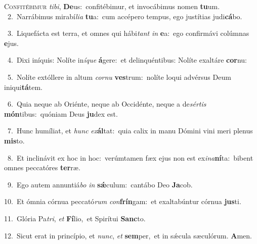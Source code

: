 \lettrine{\initial\textcolor{\initialcolor}{C}}{onfitébimur} \textit{ti}\-\textit{bi}, \textbf{De}\-us:~\star confitébimur, et invocábimus nomen \textbf{tu}\-um.\\
{\numbfont\textcolor{\numbcolor}{~2.}}~Narrábimus mirabí\-\textit{li}\-\textit{a} \textbf{tu}\-a:~\star cum accépero tempus, ego justítias judi\-\textbf{cá}\-bo.\par
{\numbfont\textcolor{\numbcolor}{~3.}}~Liquefácta est terra, et omnes qui hábi\textit{tant} \textit{in} \textbf{e}\-a:~\star ego confirmávi colúmnas \textbf{e}\-jus.\par
{\numbfont\textcolor{\numbcolor}{~4.}}~Dixi iníquis: Nolíte in\-\textit{í}\-\textit{que} \textbf{á}\-gere:~\star et delinquéntibus: Nolíte exaltáre \textbf{cor}\-nu:\par
{\numbfont\textcolor{\numbcolor}{~5.}}~Nolíte extóllere in altum \textit{cor}\-\textit{nu} \textbf{ves}\-trum:~\star nolíte loqui advérsus Deum iniqui\-\textbf{tá}\-tem.\par
{\numbfont\textcolor{\numbcolor}{~6.}}~Quia neque ab Oriénte, neque ab Occidénte, neque a de\-\textit{sér}\-\textit{tis} \textbf{món}\-tibus:~\star quóniam Deus \textbf{ju}\-dex est.\par
{\numbfont\textcolor{\numbcolor}{~7.}}~Hunc humíliat, et \textit{hunc} \textit{ex}\-\textbf{ál}tat:~\star quia calix in manu Dómini vini meri plenus \textbf{mis}\-to.\par
{\numbfont\textcolor{\numbcolor}{~8.}}~Et inclinávit ex hoc in hoc:~\dagger verúmtamen fæx ejus non est ex\-\textit{i}\-\textit{na}\textbf{ní}ta:~\star bibent omnes peccatóres \textbf{ter}\-ræ.\par
{\numbfont\textcolor{\numbcolor}{~9.}}~Ego autem annuntiá\textit{bo} \textit{in} \textbf{sǽ}\-culum:~\star cantábo Deo \textbf{Ja}\-cob.\par
{\numbfont\textcolor{\numbcolor}{10.}}~Et ómnia córnua peccató\textit{rum} \textit{con}\-\textbf{frín}gam:~\star et exaltabúntur córnua \textbf{jus}\-ti.\par
{\numbfont\textcolor{\numbcolor}{11.}}~Glória Pa\-\textit{tri}\-, \textit{et} \textbf{Fí}\-lio,~\star et Spirítui \textbf{Sanc}\-to.\par
{\numbfont\textcolor{\numbcolor}{12.}}~Sicut erat in princípio, et \textit{nunc}\-, \textit{et} \textbf{sem}\-per,~\star et in sǽcula sæculórum. \textbf{A}\-men.\par
